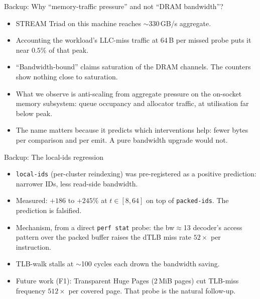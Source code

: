 \documentclass[aspectratio=169,10pt]{beamer}
\newcommand{\bad}[1]{\textcolor{red!70!black}{#1}}
\begin{document}
\begin{frame}{Backup: Why ``memory-traffic pressure'' and not ``DRAM bandwidth''?}
  \begin{itemize}
    \item STREAM Triad on this machine reaches $\sim$330\,GB/s aggregate.
    \item Accounting the workload's LLC-miss traffic at $64$\,B per missed probe puts it near $0.5\%$ of that peak.
    \item ``Bandwidth-bound'' claims saturation of the DRAM channels. The counters show nothing close to saturation.
    \item What we observe is anti-scaling from aggregate pressure on the on-socket memory subsystem: queue occupancy and allocator traffic, at utilisation far below peak.
    \item The name matters because it predicts which interventions help: fewer bytes per comparison and per emit. A pure bandwidth upgrade would not.
  \end{itemize}
\end{frame}

\begin{frame}{Backup: The local-ids regression}
  \begin{itemize}
    \item \texttt{local-ids} (per-cluster reindexing) was pre-registered as a positive prediction: narrower IDs, less read-side bandwidth.
    \item Measured: \bad{$+186$ to $+245\%$} at $t \in [8, 64]$ on top of \texttt{packed-ids}. The prediction is falsified.
    \item Mechanism, from a direct \texttt{perf stat} probe: the bw$\approx$13 decoder's access pattern over the packed buffer raises the dTLB miss rate $52\times$ per instruction.
    \item TLB-walk stalls at $\sim$100 cycles each drown the bandwidth saving.
    \item Future work (F1): Transparent Huge Pages (2\,MiB pages) cut TLB-miss frequency $512\times$ per covered page. That probe is the natural follow-up.
  \end{itemize}
\end{frame}
\end{document}

